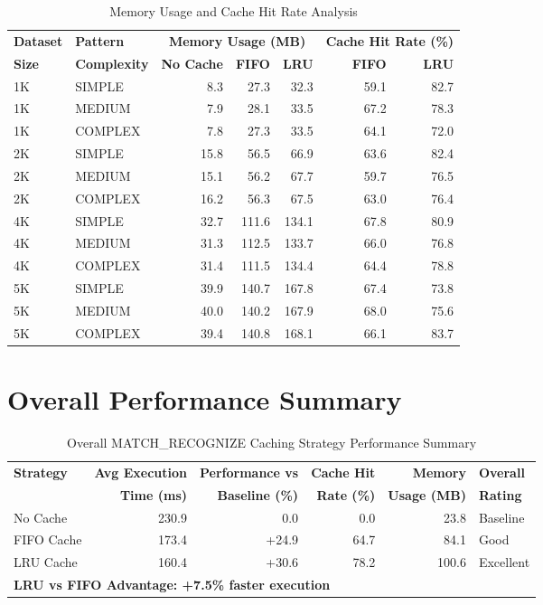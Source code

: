 \documentclass{article}
\begin{document}
\begin{table}[htbp]
\centering
\caption{Memory Usage and Cache Hit Rate Analysis}
\label{tab:memory_cache_analysis}
\begin{tabular}{|l|l|r|r|r|r|r|}
\hline
\textbf{Dataset} & \textbf{Pattern} & \multicolumn{3}{c|}{\textbf{Memory Usage (MB)}} & \multicolumn{2}{c|}{\textbf{Cache Hit Rate (\%)}} \\
\textbf{Size} & \textbf{Complexity} & \textbf{No Cache} & \textbf{FIFO} & \textbf{LRU} & \textbf{FIFO} & \textbf{LRU} \\
\hline
1K & SIMPLE & 8.3 & 27.3 & 32.3 & 59.1 & 82.7 \\
1K & MEDIUM & 7.9 & 28.1 & 33.5 & 67.2 & 78.3 \\
1K & COMPLEX & 7.8 & 27.3 & 33.5 & 64.1 & 72.0 \\
2K & SIMPLE & 15.8 & 56.5 & 66.9 & 63.6 & 82.4 \\
2K & MEDIUM & 15.1 & 56.2 & 67.7 & 59.7 & 76.5 \\
2K & COMPLEX & 16.2 & 56.3 & 67.5 & 63.0 & 76.4 \\
4K & SIMPLE & 32.7 & 111.6 & 134.1 & 67.8 & 80.9 \\
4K & MEDIUM & 31.3 & 112.5 & 133.7 & 66.0 & 76.8 \\
4K & COMPLEX & 31.4 & 111.5 & 134.4 & 64.4 & 78.8 \\
5K & SIMPLE & 39.9 & 140.7 & 167.8 & 67.4 & 73.8 \\
5K & MEDIUM & 40.0 & 140.2 & 167.9 & 68.0 & 75.6 \\
5K & COMPLEX & 39.4 & 140.8 & 168.1 & 66.1 & 83.7 \\
\hline
\end{tabular}
\end{table}

\section{Overall Performance Summary}

\begin{table}[htbp]
\centering
\caption{Overall MATCH\_RECOGNIZE Caching Strategy Performance Summary}
\label{tab:overall_performance}
\begin{tabular}{|l|r|r|r|r|l|}
\hline
\textbf{Strategy} & \textbf{Avg Execution} & \textbf{Performance vs} & \textbf{Cache Hit} & \textbf{Memory} & \textbf{Overall} \\
& \textbf{Time (ms)} & \textbf{Baseline (\%)} & \textbf{Rate (\%)} & \textbf{Usage (MB)} & \textbf{Rating} \\
\hline
No Cache & 230.9 & 0.0 & 0.0 & 23.8 & Baseline \\
FIFO Cache & 173.4 & +24.9 & 64.7 & 84.1 & Good \\
LRU Cache & 160.4 & +30.6 & 78.2 & 100.6 & Excellent \\
\hline
\multicolumn{6}{|l|}{\textbf{LRU vs FIFO Advantage: +7.5\% faster execution}} \\
\hline
\end{tabular}
\end{table}
\end{document}
